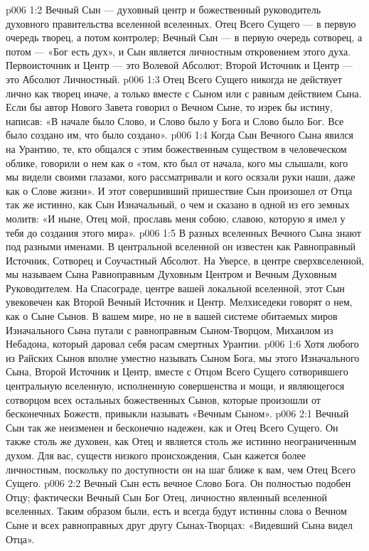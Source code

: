 \vs p006 1:2 Вечный Сын --- духовный центр и божественный руководитель духовного правительства вселенной вселенных. Отец Всего Сущего --- в первую очередь творец, а потом контролер; Вечный Сын --- в первую очередь сотворец, а потом ---  «Бог есть дух», и Сын является личностным откровением этого духа. Первоисточник и Центр --- это Волевой Абсолют; Второй Источник и Центр --- это Абсолют Личностный.
\vs p006 1:3 Отец Всего Сущего никогда не действует лично как творец иначе, а только вместе с Сыном или с равным действием Сына. Если бы автор Нового Завета говорил о Вечном Сыне, то изрек бы истину, написав: «В начале было Слово, и Слово было у Бога и Слово было Бог. Все было создано им, что было создано».
\vs p006 1:4 Когда Сын Вечного Сына явился на Урантию, те, кто общался с этим божественным существом в человеческом облике, говорили о нем как о «том, кто был от начала, кого мы слышали, кого мы видели своими глазами, кого рассматривали и кого осязали руки наши, даже как о Слове жизни». И этот совершивший пришествие Сын произошел от Отца так же истинно, как Сын Изначальный, о чем и сказано в одной из его земных молитв: «И ныне, Отец мой, прославь меня собою, славою, которую я имел у тебя до создания этого мира».
\vs p006 1:5 \pc В разных вселенных Вечного Сына знают под разными именами. В центральной вселенной он известен как Равноправный Источник, Сотворец и Соучастный Абсолют. На Уверсе, в центре сверхвселенной, мы называем Сына Равноправным Духовным Центром и Вечным Духовным Руководителем. На Спасограде, центре вашей локальной вселенной, этот Сын увековечен как Второй Вечный Источник и Центр. Мелхиседеки говорят о нем, как о Сыне Сынов. В вашем мире, но не в вашей системе обитаемых миров Изначального Сына путали с равноправным Сыном\hyp{}Творцом, Михаилом из Небадона, который даровал себя расам смертных Урантии.
\vs p006 1:6 Хотя любого из Райских Сынов вполне уместно называть Сыном Бога, мы этого Изначального Сына, Второй Источник и Центр, вместе с Отцом Всего Сущего сотворившего центральную вселенную, исполненную совершенства и мощи, и являющегося сотворцом всех остальных божественных Сынов, которые произошли от бесконечных Божеств, привыкли называть «Вечным Сыном».
\vs p006 2:1 Вечный Сын так же неизменен и бесконечно надежен, как и Отец Всего Сущего. Он также столь же духовен, как Отец и является столь же истинно неограниченным духом. Для вас, существ низкого происхождения, Сын кажется более личностным, поскольку по доступности он на шаг ближе к вам, чем Отец Всего Сущего.
\vs p006 2:2 Вечный Сын есть вечное Слово Бога. Он полностью подобен Отцу; фактически Вечный Сын  Бог Отец, личностно явленный вселенной вселенных. Таким образом были, есть и всегда будут истинны слова о Вечном Сыне и всех равноправных друг другу Сынах\hyp{}Творцах: «Видевший Сына видел Отца».

